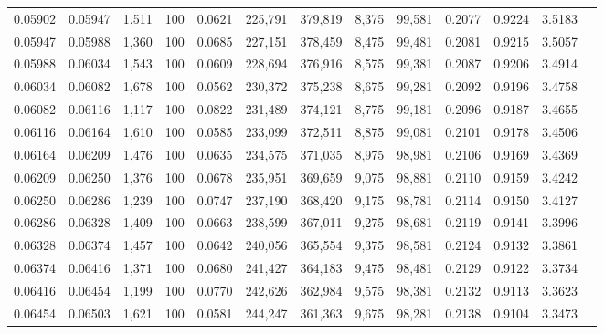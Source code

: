 \begin{tabular}{rrrrrrrrrrrrr}
0.05902 & 0.05947 & 1,511 & 100 &                                     0.0621 & 225,791 & 379,819 &   8,375 &  99,581 & 0.2077 & 0.9224 & 3.5183 \\
0.05947 & 0.05988 & 1,360 & 100 &                                     0.0685 & 227,151 & 378,459 &   8,475 &  99,481 & 0.2081 & 0.9215 & 3.5057 \\
0.05988 & 0.06034 & 1,543 & 100 &                                     0.0609 & 228,694 & 376,916 &   8,575 &  99,381 & 0.2087 & 0.9206 & 3.4914 \\
0.06034 & 0.06082 & 1,678 & 100 &                                     0.0562 & 230,372 & 375,238 &   8,675 &  99,281 & 0.2092 & 0.9196 & 3.4758 \\
0.06082 & 0.06116 & 1,117 & 100 &                                     0.0822 & 231,489 & 374,121 &   8,775 &  99,181 & 0.2096 & 0.9187 & 3.4655 \\
0.06116 & 0.06164 & 1,610 & 100 &                                     0.0585 & 233,099 & 372,511 &   8,875 &  99,081 & 0.2101 & 0.9178 & 3.4506 \\
0.06164 & 0.06209 & 1,476 & 100 &                                     0.0635 & 234,575 & 371,035 &   8,975 &  98,981 & 0.2106 & 0.9169 & 3.4369 \\
0.06209 & 0.06250 & 1,376 & 100 &                                     0.0678 & 235,951 & 369,659 &   9,075 &  98,881 & 0.2110 & 0.9159 & 3.4242 \\
0.06250 & 0.06286 & 1,239 & 100 &                                     0.0747 & 237,190 & 368,420 &   9,175 &  98,781 & 0.2114 & 0.9150 & 3.4127 \\
0.06286 & 0.06328 & 1,409 & 100 &                                     0.0663 & 238,599 & 367,011 &   9,275 &  98,681 & 0.2119 & 0.9141 & 3.3996 \\
0.06328 & 0.06374 & 1,457 & 100 &                                     0.0642 & 240,056 & 365,554 &   9,375 &  98,581 & 0.2124 & 0.9132 & 3.3861 \\
0.06374 & 0.06416 & 1,371 & 100 &                                     0.0680 & 241,427 & 364,183 &   9,475 &  98,481 & 0.2129 & 0.9122 & 3.3734 \\
0.06416 & 0.06454 & 1,199 & 100 &                                     0.0770 & 242,626 & 362,984 &   9,575 &  98,381 & 0.2132 & 0.9113 & 3.3623 \\
0.06454 & 0.06503 & 1,621 & 100 &                                     0.0581 & 244,247 & 361,363 &   9,675 &  98,281 & 0.2138 & 0.9104 & 3.3473 \\

\end{tabular}
